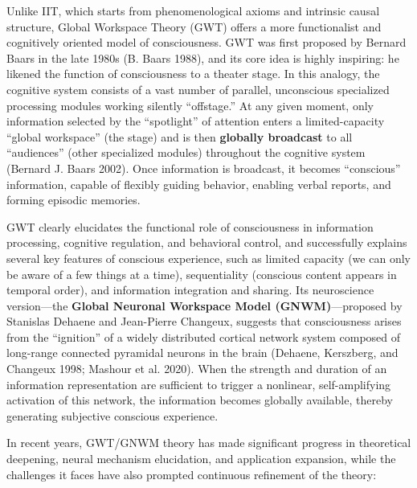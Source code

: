 \documentclass[
  a4paper]{article}
\begin{document}
Unlike IIT, which starts from phenomenological axioms and intrinsic
causal structure, Global Workspace Theory (GWT) offers a more
functionalist and cognitively oriented model of consciousness. GWT was
first proposed by Bernard Baars in the late 1980s (B. Baars 1988), and
its core idea is highly inspiring: he likened the function of
consciousness to a theater stage. In this analogy, the cognitive system
consists of a vast number of parallel, unconscious specialized
processing modules working silently ``offstage.'' At any given moment,
only information selected by the ``spotlight'' of attention enters a
limited-capacity ``global workspace'' (the stage) and is then
\textbf{globally broadcast} to all ``audiences'' (other specialized
modules) throughout the cognitive system (Bernard J. Baars 2002). Once
information is broadcast, it becomes ``conscious'' information, capable
of flexibly guiding behavior, enabling verbal reports, and forming
episodic memories.

GWT clearly elucidates the functional role of consciousness in
information processing, cognitive regulation, and behavioral control,
and successfully explains several key features of conscious experience,
such as limited capacity (we can only be aware of a few things at a
time), sequentiality (conscious content appears in temporal order), and
information integration and sharing. Its neuroscience version---the
\textbf{Global Neuronal Workspace Model (GNWM)}---proposed by Stanislas
Dehaene and Jean-Pierre Changeux, suggests that consciousness arises
from the ``ignition'' of a widely distributed cortical network system
composed of long-range connected pyramidal neurons in the brain
(Dehaene, Kerszberg, and Changeux 1998; Mashour et al. 2020). When the
strength and duration of an information representation are sufficient to
trigger a nonlinear, self-amplifying activation of this network, the
information becomes globally available, thereby generating subjective
conscious experience.

In recent years, GWT/GNWM theory has made significant progress in
theoretical deepening, neural mechanism elucidation, and application
expansion, while the challenges it faces have also prompted continuous
refinement of the theory:
\end{document}
